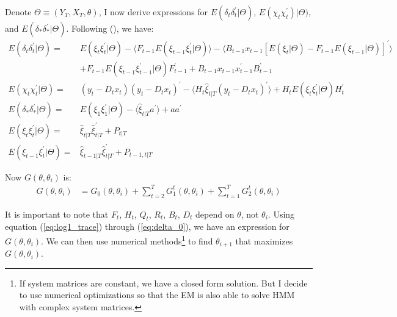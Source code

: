 \documentclass[10pt]{article}
\numberwithin{equation}{section}
\begin{document}
Denote $\Theta\equiv (Y_T,X_T,\theta)$, I now derive expressions for $E(\delta_t\delta_t^{'}|\Theta)$, $E(\chi_t\chi_t^{'})|\Theta)$, and $E(\delta_*\delta_*^{'}|\Theta)$. Following (\cite{koopman1992exact}), we have:
\begin{align}
    E(\delta_t\delta_t^{'}|\Theta) =& E(\xi_t\xi_t^{'}|\Theta) - \langle F_{t-1}E(\xi_{t-1}\xi_t^{'}|\Theta)\rangle 
        - \langle B_{t-1}x_{t-1}[E(\xi_t|\Theta) - F_{t-1}E(\xi_{t-1}|\Theta)]^{'}\rangle \nonumber \\
        &+F_{t-1}E(\xi_{t-1}\xi_{t-1}^{'}|\Theta)F_{t-1}^{'} + B_{t-1}x_{t-1}x_{t-1}^{'}B_{t-1}^{'} \label{eq:delta_t} \\
    E(\chi_t\chi_t^{'}|\Theta) =& (y_t-D_tx_t)(y_t-D_tx_t)^{'}-\langle H_t\hat{\xi}_{t|T}(y_t-D_tx_t)^{'}\rangle + H_tE(\xi_t\xi_t^{'}|\Theta)H_t^{'} \label{eq:chi_t} \\ 
    E(\delta_*\delta_*^{'}|\Theta) =& E(\xi_1\xi_1^{'}|\Theta) - \langle\hat{\xi}_{t|T}a^{'}\rangle + aa^{'} \label{eq:delta_0} \\
    E(\xi_t\xi_t^{'}|\Theta) =& \hat{\xi}_{t|T}\hat{\xi}_{t|T}^{'} + P_{t|T} \nonumber \\
    E(\xi_{t-1}\xi_t^{'}|\Theta) =& \hat{\xi}_{t-1|T}\hat{\xi}_{t|T}^{'} + P_{t-1,t|T} \nonumber
\end{align}

Now $G(\theta,\theta_{i})$ is:
\begin{align*}
    G(\theta,\theta_{i}) &= G_0(\theta,\theta_i) + \sum_{t=2}^{T}G_1^t(\theta,\theta_{i}) + \sum_{t=1}^{T}G_2^t(\theta,\theta_{i})
\end{align*}

It is important to note that $F_t$, $H_t$, $Q_t$, $R_t$, $B_t$, $D_t$ depend on $\theta$, not $\theta_i$. Using equation (\ref{eq:log1_trace}) through (\ref{eq:delta_0}), we have an expression for $G(\theta,\theta_i)$. We can then use numerical methods\footnote{If system matrices are constant, we have a closed form solution. But I decide to use numerical optimizations so that the EM is also able to solve HMM with complex system matrices.} to find $\theta_{i+1}$ that maximizes $G(\theta,\theta_{i})$.
\end{document}
